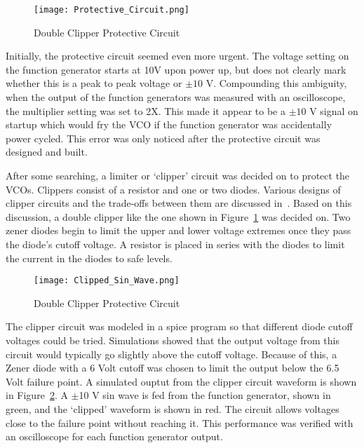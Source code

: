 \begin{figure}[ht]
\centering
\texttt{[image: Protective\_Circuit.png]}
\caption{Double Clipper Protective Circuit}

\label{fig:Clipper}

\end{figure}


 Initially, the protective circuit seemed even more urgent. The voltage setting on the function generator starts at 10V upon power up, but does not clearly mark whether this is a peak to peak voltage or $\pm10$ V. Compounding this ambiguity, when the output of the function generators was measured with an oscilloscope, the multiplier setting was set to 2X. This made it appear to be a $\pm10$ V signal on startup which would fry the VCO if the function generator was accidentally power cycled. This error was only noticed after the protective circuit was designed and built. 

After some searching, a limiter or `clipper' circuit was decided on to protect the VCOs. Clippers consist of a resistor and one or two diodes. Various designs of clipper circuits and the trade-offs between them are discussed in~\cite{sedra_microelectronic_2015}. Based on this discussion, a double clipper like the one shown in Figure~\ref{fig:Clipper} was decided on. Two zener diodes begin to limit the upper and lower voltage extremes once they pass the diode's cutoff voltage. A resistor is placed in series with the diodes to limit the current in the diodes to safe levels. 
\begin{figure}[ht]
\centering
\texttt{[image: Clipped\_Sin\_Wave.png]}
\caption{Double Clipper Protective Circuit}

\label{fig:Clipped_Sin}

\end{figure}

The clipper circuit was modeled in a spice program so that different diode cutoff voltages could be tried. Simulations showed that the output voltage from this circuit would typically go slightly above the cutoff voltage. Because of this, a Zener diode with a 6 Volt cutoff was chosen to limit the output below the 6.5 Volt failure point. A simulated ouptut from the clipper circuit waveform is shown in Figure~\ref{fig:Clipped_Sin}. A $\pm$10 V sin wave is fed from the function generator, shown in green, and the `clipped' waveform is shown in red. The circuit allows voltages close to the failure point without reaching it. This performance was verified with an oscilloscope for each function generator output.


